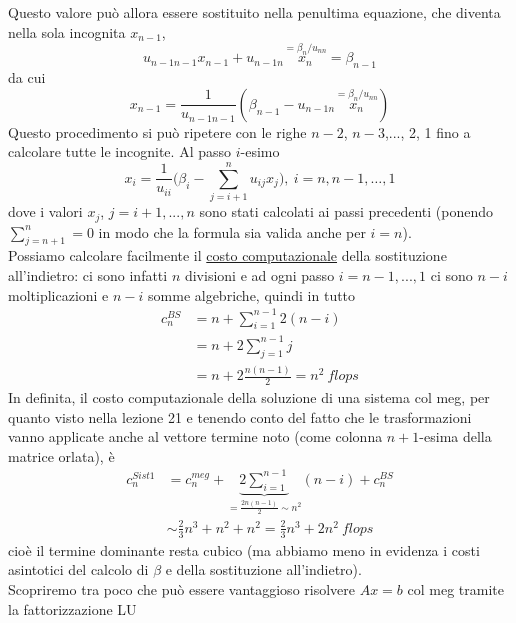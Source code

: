 \documentclass[12pt,a4paper]{article}
\begin{document}
Questo valore può allora essere sostituito nella penultima equazione, che diventa nella sola incognita $x_{n-1}$,
\[
u_{n-1n-1}x_{n-1}+u_{n-1n}\overset{=\beta_n/u_{nn}}{x_n}=\beta_{n-1}
\]
da cui 
\[x_{n-1}=\frac{1}{u_{n-1n-1}}(\beta_{n-1}-u_{n-1n}\overset{=\beta_n/u_{nn}}{x_n})
\]
Questo procedimento si può ripetere con le righe $n-2$, $n-3$,..., 2, 1 fino a calcolare tutte le incognite. Al passo $i$-esimo
\begin{equation*}
    x_i = \frac{1}{u_{ii}} \biggl( \beta_i - \sum_{j=i+1}^n u_{ij}x_j \biggr), \ i=n,n-1,\dots,1
\end{equation*}
dove i valori $x_j$, $j=i+1,...,n$ sono stati calcolati ai passi precedenti (ponendo $\sum_{j=n+1}^n = 0$ in modo che la formula sia valida anche per $i=n$). \\
Possiamo calcolare facilmente il \uline{costo computazionale} della sostituzione all'indietro: ci sono infatti $n$ divisioni e ad ogni passo $i=n-1,...,1$ ci sono $n-i$ moltiplicazioni e $n-i$ somme algebriche, quindi in tutto
\begin{equation*}
    \begin{split}
        c_n^{BS} & = n + \sum_{i=1}^{n-1} 2(n-i) \\
                 & = n + 2\sum_{j=1}^{n-1} j \\
                 & = n + 2\frac{n(n-1)}{2} = n^2 \ flops
    \end{split}
\end{equation*}
In definita, il costo computazionale della soluzione di una sistema col meg, per quanto visto nella lezione 21 e tenendo conto del fatto che le trasformazioni vanno applicate anche al vettore termine noto (come colonna $n+1$-esima della matrice orlata), è 
\begin{equation*}
    \begin{split}
        c_n^{Sist1} & = c_n^{meg} + \underbrace{2\sum_{i=1}^{n-1}}_{=\frac{2n(n-1)}{2}\sim n^2} (n-i) + c_n^{BS} \\
        & \sim \frac{2}{3}n^3 + n^2 + n^2 = \frac{2}{3}n^3 + 2n^2 \ flops
    \end{split}
\end{equation*}
cioè il termine dominante resta cubico (ma abbiamo meno in evidenza i costi asintotici del calcolo di $\beta$ e della sostituzione all'indietro). \\
Scopriremo tra poco che può essere vantaggioso risolvere $Ax=b$ col meg tramite la fattorizzazione LU
\end{document}
